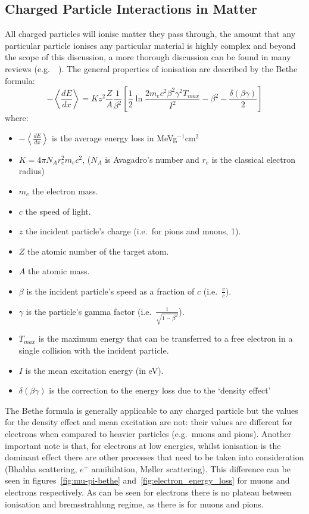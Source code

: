 \subsection{Charged Particle Interactions in Matter} %
\label{sec:charged_particle_interactions_in_matter}
All charged particles will ionise matter they pass through, the amount that any particular particle ionises any particular material is highly complex and beyond the scope of this discussion, a more thorough discussion can be found in many reviews (e.g.\ ~\cite{pdg}). The general properties of ionisation are described by the Bethe formula:
\begin{equation}\label{eq:bethe_formaula}
  -\left\langle\frac{dE}{dx}\right\rangle = Kz^2\frac{Z}{A} \frac{1}{\beta^2}\left[\frac{1}{2}\ln\frac{2m_{e}c^{2}\beta^2\gamma^2T_{max}}{I^2} -\beta^2 - \frac{\delta(\beta\gamma)}{2}\right]
\end{equation}
where:
\begin{itemize}
  \item \( -\left\langle\frac{dE}{dx}\right\rangle \) is the average energy loss in MeVg\(^{-1}\)cm\(^2\)
  \item \( K = 4\pi N_A r^2_e m_e c^2\), (\( N_A \) is Avagadro's number and \( r_e \) is the classical electron radius) 
  \item \( m_e \) the electron mass.
  \item \( c \) the speed of light.
  \item \( z \) the incident particle's charge (i.e.\ for pions and muons, 1).
  \item \( Z \) the atomic number of the target atom.
  \item \( A \) the atomic mass.
  \item \( \beta \) is the incident particle's speed as a fraction of \( c \) (i.e.\ \( \frac{v}{c} \)).
  \item \( \gamma \) is the particle's gamma factor (i.e.\ \( \frac{1}{\sqrt{1-\beta^2}} \)).
  \item \( T_{max} \) is the maximum energy that can be transferred to a free electron in a single collision with the incident particle.
  \item \( I \) is the mean excitation energy (in eV).
  \item \( \delta(\beta\gamma) \) is the correction to the energy loss due to the `density effect'
\end{itemize}
The Bethe formula is generally applicable to any charged particle but the values for the density effect and mean excitation are not: their values are different for electrons when compared to heavier particles (e.g.\ muons and pions). Another important note is that, for electrons at low energies, whilst ionisation is the dominant effect there are other processes that need to be taken into consideration (Bhabha scattering, \(e^+\) annihilation, M\o ller scattering). This difference can be seen in figures~\ref{fig:mu-pi-bethe} and~\ref{fig:electron_energy_loss} for muons and electrons respectively. As can be seen for electrons there is no plateau between ionisation and bremsstrahlung regime, as there is for muons and pions.  
